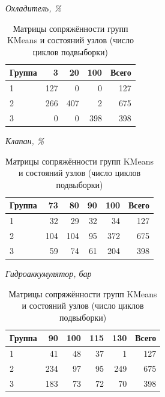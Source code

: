 \begin{table}[H]
\centering
\small
\caption{Матрицы сопряжённости групп KMeans и состояний узлов (число циклов подвыборки)}\label{tab:crosstab}
\begin{center}\textit{Охладитель, \%}\end{center}
\begin{tabular}{lrrrr}
\toprule
Группа & 3 & 20 & 100 & Всего \\
\midrule
1 & 127 & 0 & 0 & 127 \\
2 & 266 & 407 & 2 & 675 \\
3 & 0 & 0 & 398 & 398 \\
\bottomrule
\end{tabular}
\par\medskip
\begin{center}\textit{Клапан, \%}\end{center}
\begin{tabular}{lrrrrr}
\toprule
Группа & 73 & 80 & 90 & 100 & Всего \\
\midrule
1 & 32 & 29 & 32 & 34 & 127 \\
2 & 104 & 104 & 95 & 372 & 675 \\
3 & 59 & 74 & 61 & 204 & 398 \\
\bottomrule
\end{tabular}
\par\medskip
\begin{center}\textit{Гидроаккумулятор, бар}\end{center}
\begin{tabular}{lrrrrr}
\toprule
Группа & 90 & 100 & 115 & 130 & Всего \\
\midrule
1 & 41 & 48 & 37 & 1 & 127 \\
2 & 234 & 97 & 95 & 249 & 675 \\
3 & 183 & 73 & 72 & 70 & 398 \\
\bottomrule
\end{tabular}
\end{table}

